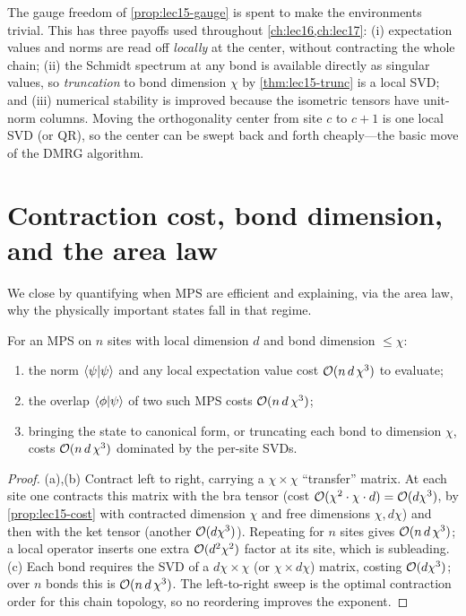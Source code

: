 \begin{remark}
The gauge freedom of \cref{prop:lec15-gauge} is spent to make the environments
trivial. This has three payoffs used throughout \cref{ch:lec16,ch:lec17}: (i)
expectation values and norms are read off \emph{locally} at the center, without
contracting the whole chain; (ii) the Schmidt spectrum at any bond is available
directly as singular values, so \emph{truncation} to bond dimension $\chi$ by
\cref{thm:lec15-trunc} is a local SVD; and (iii) numerical stability is improved
because the isometric tensors have unit-norm columns. Moving the orthogonality
center from site $c$ to $c+1$ is one local SVD (or QR), so the center can be swept
back and forth cheaply---the basic move of the DMRG algorithm.
\end{remark}

\section{Contraction cost, bond dimension, and the area law}
\label{sec:lec15-5}

We close by quantifying when MPS are efficient and explaining, via the area law,
why the physically important states fall in that regime.

\begin{proposition}\label{prop:lec15-mpscost}
For an MPS on $n$ sites with local dimension $d$ and bond dimension $\le\chi$:
\begin{enumerate}[label=\textup{(\alph*)}]
  \item the norm $\braket{\psi|\psi}$ and any local expectation value cost
        $\mathcal{O}(n\,d\,\chi^{3})$ to evaluate;
  \item the overlap $\braket{\phi|\psi}$ of two such MPS costs
        $\mathcal{O}(n\,d\,\chi^{3})$;
  \item bringing the state to canonical form, or truncating each bond to
        dimension $\chi$, costs $\mathcal{O}(n\,d\,\chi^{3})$ dominated by the per-site
        SVDs.
\end{enumerate}
\end{proposition}

\begin{proof}
(a),(b) Contract left to right, carrying a $\chi\times\chi$ ``transfer'' matrix.
At each site one contracts this matrix with the bra tensor
(cost $\mathcal{O}(\chi^{2}\cdot\chi\cdot d)=\mathcal{O}(d\chi^{3})$, by
\cref{prop:lec15-cost} with contracted dimension $\chi$ and free dimensions
$\chi,d\chi$) and then with the ket tensor (another $\mathcal{O}(d\chi^{3})$). Repeating
for $n$ sites gives $\mathcal{O}(n\,d\,\chi^{3})$; a local operator inserts one extra
$\mathcal{O}(d^{2}\chi^{2})$ factor at its site, which is subleading. (c) Each bond
requires the SVD of a $d\chi\times\chi$ (or $\chi\times d\chi$) matrix, costing
$\mathcal{O}(d\chi^{3})$; over $n$ bonds this is $\mathcal{O}(n\,d\,\chi^{3})$. The
left-to-right sweep is the optimal contraction order for this chain topology, so
no reordering improves the exponent.
\end{proof}

